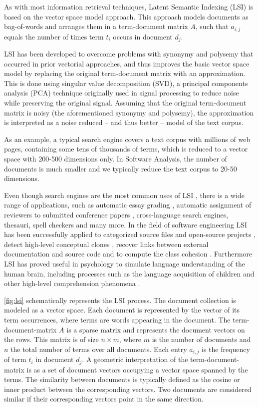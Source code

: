 As with most information retrieval techniques, Latent Semantic Indexing (LSI) is based on the vector space model approach. This approach models documents as bag-of-words and arranges them in a term-document matrix $A$, such that $a_{i,j}$ equals the number of times term $t_i$ occurs in document $d_j$.

LSI has been developed to overcome problems with synonymy and polysemy that occurred in prior vectorial approaches, and thus improves the basic vector space model by replacing the original term-document matrix with an approximation. This is done using singular value decomposition (SVD), a principal components analysis (PCA) technique originally used in signal processing to reduce noise while preserving the original signal. Assuming that the original term-document matrix is noisy (the aforementioned synonymy and polysemy), the approximation is interpreted as a noise reduced -- and thus better -- model of the text corpus.

As an example, a typical search engine covers a text corpus with millions of web pages, containing some tens of thousands of terms, which is reduced to a vector space with 200-500 dimensions only. In Software Analysis, the number of documents is much smaller and we typically reduce the text corpus to 20-50 dimensions.

Even though search engines are the most common uses of LSI \cite{Berr94a}, there is a wide range of applications, such as automatic essay grading \cite{Folt99a}, automatic assignment of reviewers to submitted conference papers \cite{Duma92a},  cross-language search engines, thesauri, spell checkers and many more.
In the field of software engineering LSI has been successfully applied to categorized source files \cite{Male00a} and open-source projects \cite{Kawa04a}, detect high-level conceptual clones \cite{Marc01a}, recover links between external documentation and source code \cite{Luci04a,Marc05a} and to compute the class cohesion \cite{Marc05a}. Furthermore LSI has proved useful in psychology to simulate language understanding of the human brain, including processes such as the language acquisition of children and other high-level comprehension phenomena \cite{Land97a}.

\autoref{fig:lsi} schematically represents the LSI process. The document collection is modeled as a vector space. Each document is represented by the vector of its term occurrences, where terms are words appearing in the document. The term-document-matrix $A$ is a sparse matrix and represents the document vectors on the rows. This matrix is of size $n \times m$, where $m$ is the number of documents and $n$ the total number of terms over all documents. Each entry $a_{i,j}$ is the frequency of term $t_i$ in document $d_j$. A geometric interpretation of the term-document-matrix is as a set of document vectors occupying a vector space spanned by the terms. The similarity between documents is typically defined as the cosine or inner product between the corresponding vectors. Two documents are considered similar if their corresponding vectors point in the same direction.

